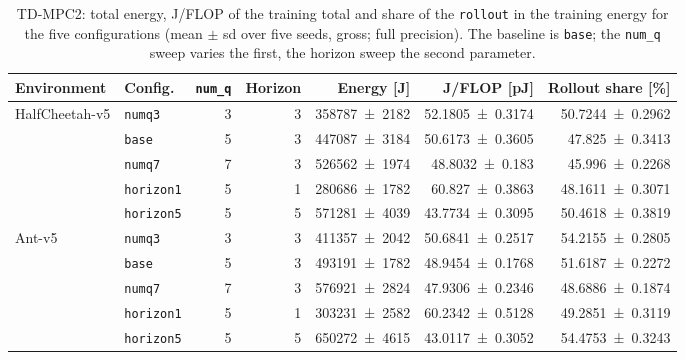 \begin{table}[tbp]
  \centering
  \footnotesize
  \caption{TD-MPC2: total energy, J/FLOP of the training total and share of the \texttt{rollout} in the training energy for the five configurations (mean $\pm$ sd over five seeds, gross; full precision). The baseline is \texttt{base}; the \texttt{num\_\allowbreak q} sweep varies the first, the horizon sweep the second parameter.}
  \label{tab:app-rob-tdmpc2}
  \begin{tabular}{@{}llrrrrr@{}}
    \toprule
    Environment & Config. & \texttt{num\_\allowbreak q} & Horizon & Energy [J] & J/FLOP [pJ] & Rollout share [\%] \\
    \midrule
    HalfCheetah-v5 & \texttt{numq3} & \num{3} & \num{3} & \num{358787+-2182} & \num{52.1805+-0.3174} & \num{50.7244+-0.2962} \\
     & \texttt{base} & \num{5} & \num{3} & \num{447087+-3184} & \num{50.6173+-0.3605} & \num{47.825+-0.3413} \\
     & \texttt{numq7} & \num{7} & \num{3} & \num{526562+-1974} & \num{48.8032+-0.183} & \num{45.996+-0.2268} \\
     & \texttt{horizon1} & \num{5} & \num{1} & \num{280686+-1782} & \num{60.827+-0.3863} & \num{48.1611+-0.3071} \\
     & \texttt{horizon5} & \num{5} & \num{5} & \num{571281+-4039} & \num{43.7734+-0.3095} & \num{50.4618+-0.3819} \\
    \midrule
    Ant-v5 & \texttt{numq3} & \num{3} & \num{3} & \num{411357+-2042} & \num{50.6841+-0.2517} & \num{54.2155+-0.2805} \\
     & \texttt{base} & \num{5} & \num{3} & \num{493191+-1782} & \num{48.9454+-0.1768} & \num{51.6187+-0.2272} \\
     & \texttt{numq7} & \num{7} & \num{3} & \num{576921+-2824} & \num{47.9306+-0.2346} & \num{48.6886+-0.1874} \\
     & \texttt{horizon1} & \num{5} & \num{1} & \num{303231+-2582} & \num{60.2342+-0.5128} & \num{49.2851+-0.3119} \\
     & \texttt{horizon5} & \num{5} & \num{5} & \num{650272+-4615} & \num{43.0117+-0.3052} & \num{54.4753+-0.3243} \\
    \bottomrule
  \end{tabular}
\end{table}

